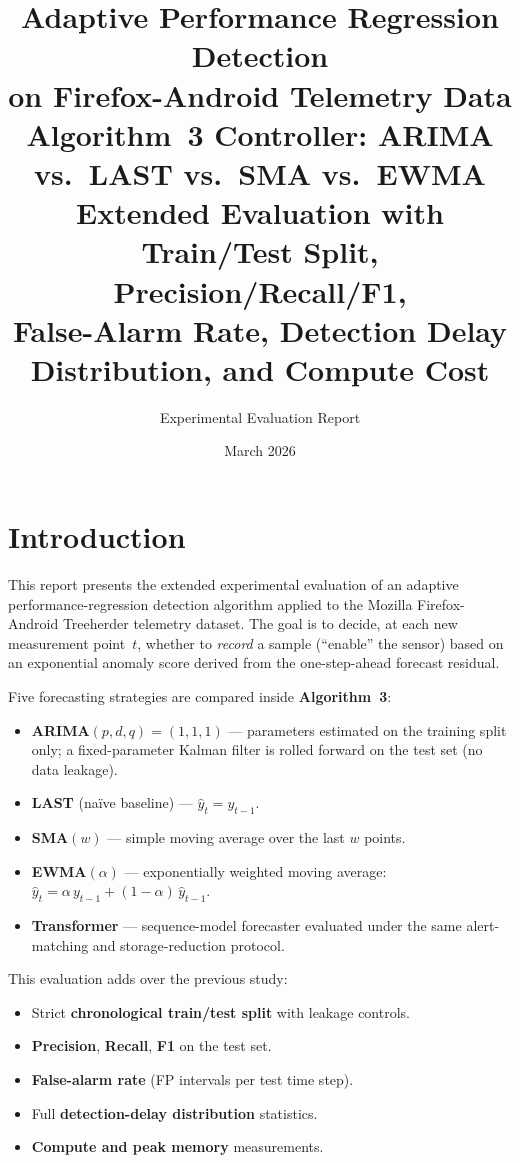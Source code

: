 \documentclass[11pt,a4paper]{article}
\title{\textbf{Adaptive Performance Regression Detection\\
on Firefox-Android Telemetry Data}\\[0.4em]
\large Algorithm~3 Controller: ARIMA vs.\ LAST vs.\ SMA vs.\ EWMA\\
\normalsize Extended Evaluation with Train/Test Split, Precision/Recall/F1,\\
False-Alarm Rate, Detection Delay Distribution, and Compute Cost}
\author{Experimental Evaluation Report}
\date{March 2026}
\begin{document}
\maketitle
\tableofcontents
\newpage

\section{Introduction}

This report presents the extended experimental evaluation of an adaptive
performance-regression detection algorithm applied to the Mozilla
Firefox-Android Treeherder telemetry dataset.  The goal is to decide, at
each new measurement point~$t$, whether to \emph{record} a sample
(``enable'' the sensor) based on an exponential anomaly score derived from
the one-step-ahead forecast residual.

Five forecasting strategies are compared inside \textbf{Algorithm~3}:
\begin{itemize}
  \item \textbf{ARIMA}$(p,d,q)=(1,1,1)$ --- parameters estimated on the
        training split only; a fixed-parameter Kalman filter is rolled
        forward on the test set (no data leakage).
  \item \textbf{LAST} (na\"{i}ve baseline) --- $\hat{y}_t = y_{t-1}$.
  \item \textbf{SMA}$(w)$ --- simple moving average over the last $w$ points.
  \item \textbf{EWMA}$(\alpha)$ --- exponentially weighted moving average:
        $\hat{y}_t = \alpha\,y_{t-1} + (1{-}\alpha)\,\hat{y}_{t-1}$.
  \item \textbf{Transformer} --- sequence-model forecaster evaluated under the
        same alert-matching and storage-reduction protocol.
\end{itemize}

This evaluation adds over the previous study:
\begin{itemize}
  \item Strict \textbf{chronological train/test split} with leakage controls.
  \item \textbf{Precision}, \textbf{Recall}, \textbf{F1} on the test set.
  \item \textbf{False-alarm rate} (FP intervals per test time step).
  \item Full \textbf{detection-delay distribution} statistics.
  \item \textbf{Compute and peak memory} measurements.
\end{itemize}
\end{document}
